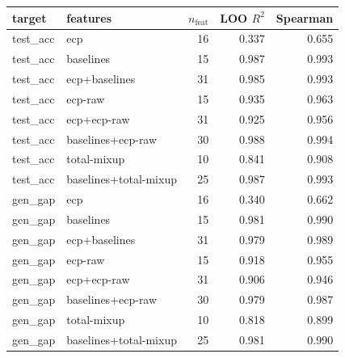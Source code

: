 \begin{tabular}{llrrr}
\toprule
target & features & $n_{\mathrm{feat}}$ & LOO $R^2$ & Spearman \\
\midrule
test\_acc & ecp & 16 & 0.337 & 0.655 \\
test\_acc & baselines & 15 & 0.987 & 0.993 \\
test\_acc & ecp+baselines & 31 & 0.985 & 0.993 \\
test\_acc & ecp-raw & 15 & 0.935 & 0.963 \\
test\_acc & ecp+ecp-raw & 31 & 0.925 & 0.956 \\
test\_acc & baselines+ecp-raw & 30 & 0.988 & 0.994 \\
test\_acc & total-mixup & 10 & 0.841 & 0.908 \\
test\_acc & baselines+total-mixup & 25 & 0.987 & 0.993 \\
gen\_gap & ecp & 16 & 0.340 & 0.662 \\
gen\_gap & baselines & 15 & 0.981 & 0.990 \\
gen\_gap & ecp+baselines & 31 & 0.979 & 0.989 \\
gen\_gap & ecp-raw & 15 & 0.918 & 0.955 \\
gen\_gap & ecp+ecp-raw & 31 & 0.906 & 0.946 \\
gen\_gap & baselines+ecp-raw & 30 & 0.979 & 0.987 \\
gen\_gap & total-mixup & 10 & 0.818 & 0.899 \\
gen\_gap & baselines+total-mixup & 25 & 0.981 & 0.990 \\
\bottomrule
\end{tabular}
